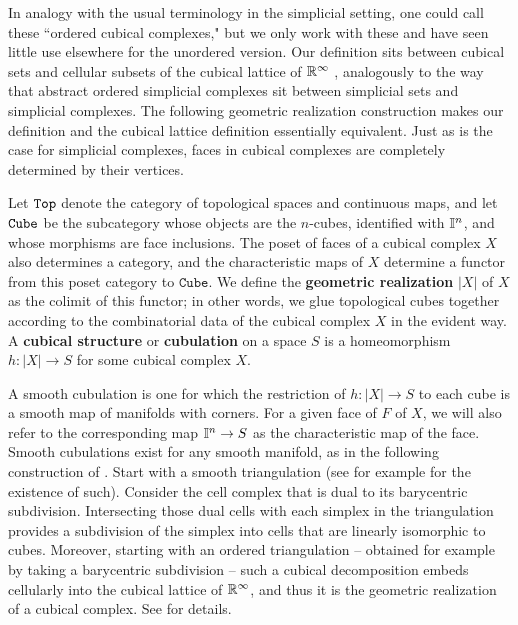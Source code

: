 In analogy with the usual terminology in the simplicial setting, one could call these ``ordered cubical complexes," but we only work with these and have seen little use elsewhere for the unordered version.
Our definition sits between cubical sets \cite{jardine2002cubical} and cellular subsets of the cubical lattice of $\mathbb{R}^\infty$ \cite{kaczynski2006computational}, analogously to the way that abstract ordered simplicial complexes sit between simplicial sets and simplicial complexes.
The following geometric realization construction makes our definition and the cubical lattice definition essentially equivalent.
Just as is the case for simplicial complexes, faces in cubical complexes are completely determined by their vertices.


Let ${\tt Top}$ denote the category of topological spaces and continuous maps, and let ${\tt Cube}$ be the subcategory whose objects are the $n$-cubes, identified with $\mathbb{I}^n$, and whose morphisms are face inclusions.
The poset of faces of a cubical complex $X$ also determines a category, and the characteristic maps of $X$ determine a functor from this poset category to $\mathtt{Cube}$.
We define the \textbf{geometric realization} $|X|$ of $X$ as the colimit of this functor; in other words, we glue topological cubes together according to the combinatorial data of the cubical complex $X$ in the evident way.
A \textbf{cubical structure} or \textbf{cubulation} on a space $S$ is a homeomorphism $h \colon |X| \to S$ for some cubical complex $X$.

\begin{comment}
	We abuse notation and write $h \circ \iota_{|\sigma|}$ simply as $\iota_\sigma$ for any $\sigma \in X$ when a cubical structure $h \colon |X| \to S$ is understood.
\end{comment}

A smooth cubulation is one for which the restriction of $h \colon |X| \to S$ to each cube is a smooth map of manifolds with corners.
For a given face of $F$ of $X$, we will also refer to the corresponding map $\mathbb{I}^n \to S$ as the characteristic map of the face.
Smooth cubulations exist for any smooth manifold, as in the following construction of \cite{ShSh92}.
Start with a smooth triangulation (see for example \cite[Theorem 10.6]{MUNK66} for the existence of such).
Consider the cell complex that is dual to its barycentric subdivision.
Intersecting those dual cells with each simplex in the triangulation provides a subdivision of the simplex into cells that are linearly isomorphic to cubes.
Moreover, starting with an ordered triangulation -- obtained for example by taking a barycentric subdivision -- such a cubical decomposition embeds cellularly into the cubical lattice of $\mathbb{R}^\infty$, and thus it is the geometric realization of a cubical complex.
See \cite{ShSh92} for details.


